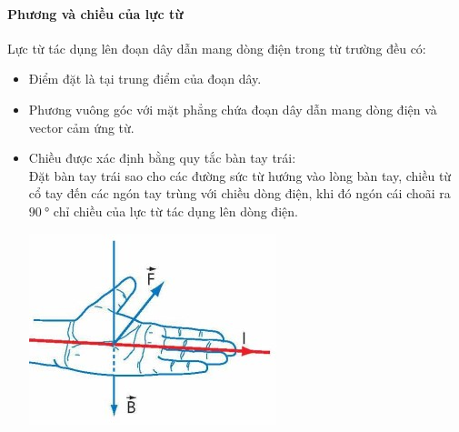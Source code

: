 \begin{tomtat}
	\paragraph{Phương và chiều của lực từ}
	Lực từ tác dụng lên đoạn dây dẫn mang dòng điện trong từ trường đều có:
	\begin{itemize}
		\item Điểm đặt là tại trung điểm của đoạn dây.
		\item Phương vuông góc với mặt phẳng chứa đoạn dây dẫn mang dòng điện và vector cảm ứng từ.
		\item Chiều được xác định bằng quy tắc bàn tay trái:\\
		Đặt bàn tay trái sao cho các đường sức từ hướng vào lòng bàn tay, chiều từ cổ tay đến các ngón tay trùng với chiều dòng điện, khi đó ngón cái choãi ra $\SI{90}{\degree}$ chỉ chiều của lực từ tác dụng lên dòng điện.
		\begin{center}
			\includegraphics[width=0.3\linewidth]{figs/VN12-Y24-PH-SYL-017-8}
		\end{center}
	\end{itemize}
\end{tomtat}


